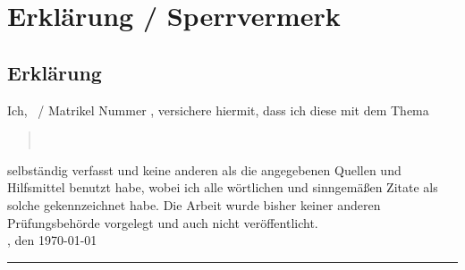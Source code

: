 \setlength{\parindent}{0pt}

\chapter*{Erklärung / Sperrvermerk}
\label{cha:erklaerung_sperrvermerk}


\section*{Erklärung}
\label{sec:erklaerung}

Ich, \autor\ / Matrikel Nummer \matrikelnr, versichere hiermit, dass ich diese \art{} mit dem Thema
\begin{quote}
\centering
\large{\textit{\titel}}\\
\normalsize{\textit{\untertitel}}
\end{quote}
selbständig verfasst und keine anderen als die angegebenen Quellen und Hilfsmittel benutzt habe, wobei ich alle wörtlichen und sinngem\"a\ss{}en Zitate als solche gekennzeichnet habe. Die Arbeit wurde bisher keiner anderen Prüfungsbehörde vorgelegt und auch nicht veröffentlicht.\\[1ex]

\ort, den \today \\[1ex]

\rule[-0.2cm]{7cm}{0.5pt}\\
\small{\textit{\autor}} \\[1ex]
\setlength{\parindent}{15pt}